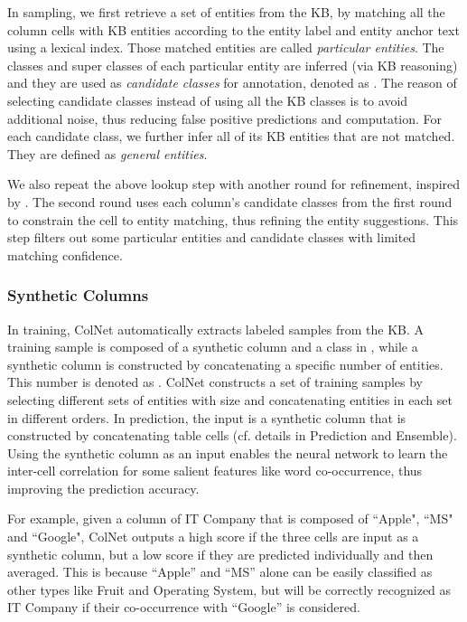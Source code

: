 \documentclass[letterpaper]{article}
\newcommand{\rv}[1]{{\color{black}#1}}
\newcommand{\camera}[1]{{\color{black}#1}}
\newcommand{\ColNet}{\textsf{ColNet}\xspace}
\begin{document}
In sampling, we first retrieve a set of entities from the KB, 
by matching all the column cells with KB entities according to the entity label and entity anchor text using a lexical index.
Those matched entities are called \textit{particular entities}. 
The classes and super classes of each particular entity are  inferred (via KB reasoning) and
\rv{they are used 
as \textit{candidate classes} for annotation, denoted as .
The reason of selecting candidate classes instead of using all the KB classes is to avoid additional noise, thus reducing false positive predictions and computation.
For each candidate class, we further infer all of its KB entities that are not matched.
They are defined as \textit{general entities}.
}

We also repeat the above lookup step with another round for refinement, 
\rv{inspired by \cite{syed2010exploiting,mulwad2010using}.}
The second round uses each column's candidate classes from the first round to constrain the cell to entity matching,
thus refining the \camera{entity suggestions}.
\camera{This step} filters out some particular entities and candidate classes with limited matching confidence.


\subsubsection{Synthetic Columns}
\rv{In training, \ColNet automatically extracts labeled samples from the KB.
A training sample  is composed of 
a synthetic column  and a class  in ,
while a synthetic column is constructed by concatenating a specific number of entities.
This number is denoted as .
}
\rv{\ColNet constructs a set of training samples by selecting different sets of entities with size  and concatenating entities in each set in different orders.
}
\rv{In prediction, the input is a synthetic column that is constructed by concatenating table cells (cf. details in Prediction and Ensemble).}
Using the synthetic column as an input enables the neural network to learn the inter-cell correlation for some salient features like word co-occurrence, 
thus improving the prediction accuracy.

\rv{For example, given a column of IT Company that is composed of ``Apple", ``MS" and ``Google",
\ColNet outputs a high score if the three cells are input as a synthetic column,
but a low score if they \camera{are} predicted individually and then averaged.
This is because ``Apple'' and ``MS'' alone can be easily classified as other types like Fruit and \camera{Operating} System, 
but will be correctly recognized as IT Company if their co-occurrence with ``Google'' is considered.
}
\end{document}
